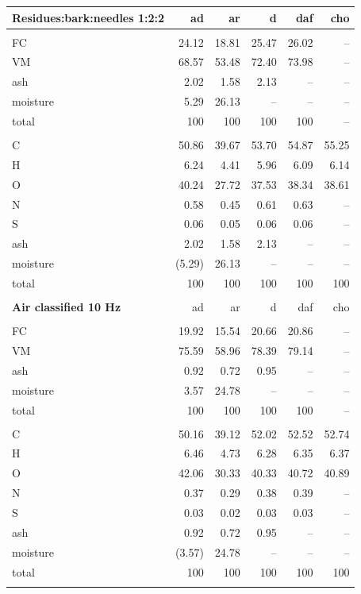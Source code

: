 \documentclass[12pt,titlepage]{article}
\begin{document}
\begin{longtable}{lrrrrr}
    \textbf{Residues:bark:needles 1:2:2} & ad & ar & d & daf & cho \\
    \hline \\
    FC       & 24.12  & 18.81  & 25.47  & 26.02  & -- \\
    VM       & 68.57  & 53.48  & 72.40  & 73.98  & -- \\
    ash      & 2.02   & 1.58   & 2.13   & --     & -- \\
    moisture & 5.29   & 26.13  & --     & --     & -- \\
    total    & 100    & 100    & 100    & 100    & -- \\
    \\
    C        & 50.86  & 39.67  & 53.70  & 54.87  & 55.25 \\
    H        & 6.24   & 4.41   & 5.96   & 6.09   & 6.14 \\
    O        & 40.24  & 27.72  & 37.53  & 38.34  & 38.61 \\
    N        & 0.58   & 0.45   & 0.61   & 0.63   & -- \\
    S        & 0.06   & 0.05   & 0.06   & 0.06   & -- \\
    ash      & 2.02   & 1.58   & 2.13   & --     & -- \\
    moisture & (5.29) & 26.13  & --     & --     & -- \\
    total    & 100    & 100    & 100    & 100    & 100 \\
    \\

    \textbf{Air classified 10 Hz} & ad & ar & d & daf & cho \\
    \hline \\
    FC       & 19.92  & 15.54  & 20.66  & 20.86  & -- \\
    VM       & 75.59  & 58.96  & 78.39  & 79.14  & -- \\
    ash      & 0.92   & 0.72   & 0.95   & --     & -- \\
    moisture & 3.57   & 24.78  & --     & --     & -- \\
    total    & 100    & 100    & 100    & 100    & -- \\
    \\
    C        & 50.16  & 39.12  & 52.02  & 52.52  & 52.74 \\
    H        & 6.46   & 4.73   & 6.28   & 6.35   & 6.37 \\
    O        & 42.06  & 30.33  & 40.33  & 40.72  & 40.89 \\
    N        & 0.37   & 0.29   & 0.38   & 0.39   & -- \\
    S        & 0.03   & 0.02   & 0.03   & 0.03   & -- \\
    ash      & 0.92   & 0.72   & 0.95   & --     & -- \\
    moisture & (3.57) & 24.78  & --     & --     & -- \\
    total    & 100    & 100    & 100    & 100    & 100 \\
    \\


\end{longtable}
\end{document}
